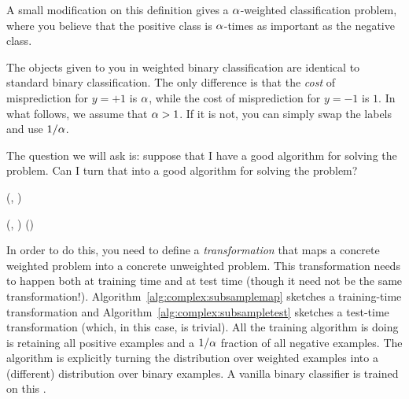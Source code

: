 A small modification on this definition gives a $\al$-weighted
classification problem, where you believe that the positive class is
$\al$-times as important as the negative class.


The objects given to you in weighted binary classification are
identical to standard binary classification.  The only difference is
that the \emph{cost} of misprediction for $y=+1$ is $\al$, while the
cost of misprediction for $y=-1$ is $1$.  In what follows, we assume
that $\alpha > 1$.  If it is not, you can simply swap the labels and use
$1/\alpha$.

The question we will ask is: suppose that I have a good algorithm for
solving the  problem.  Can I turn that
into a good algorithm for solving the  problem?

  {(, \VAR{$\al$})}
  {
\ENDIF
\ENDWHILE
}

  {(, \VAR{$\hat\vx$})}
  {
\RETURN {}(\VAR{$\hat\vx$})
}

In order to do this, you need to define a \emph{transformation} that
maps a concrete weighted problem into a concrete unweighted problem.
This transformation needs to happen both at training time and at test
time (though it need not be the same transformation!).
Algorithm~\ref{alg:complex:subsamplemap} sketches a training-time
 transformation and
Algorithm~\ref{alg:complex:subsampletest} sketches a test-time
transformation (which, in this case, is trivial).  All the training
algorithm is doing is retaining all positive examples and a $1/\alpha$
fraction of all negative examples.  The algorithm is explicitly
turning the distribution over weighted examples into a (different)
distribution over binary examples.  A vanilla binary classifier is
trained on this .


